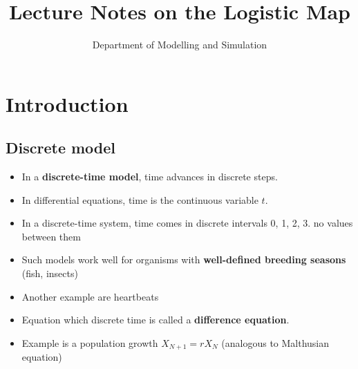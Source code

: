 \documentclass[12pt,a4paper]{article}
\title{Lecture Notes on the Logistic Map}
\author{Department of Modelling and Simulation}
\date{}
\begin{document}
\maketitle

\section{Introduction}

\subsection{Discrete model}
\begin{itemize}
    \item In a \textbf{discrete-time model}, time advances in discrete steps. 
    \item In differential equations, time is the
continuous variable $t$.
\item In a discrete-time system, time comes in discrete intervals 0, 1, 2, 3.  no values between them
\item Such models work well for organisms with \textbf{well-defined breeding seasons} (fish, insects)
\item  Another example are heartbeats
\item Equation which discrete time is called a \textbf{difference equation}. 
\item Example is a population growth $X_{N+1} = rX_N$ (analogous to Malthusian equation)
\end{itemize}
\end{document}
